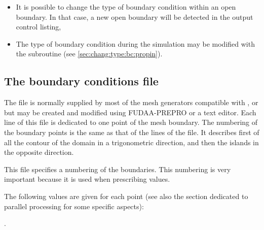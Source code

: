 \begin{itemize}
\item It is possible to change the type of boundary condition within an open
boundary.
In that case, a new open boundary will be detected in the output control listing,

\item The type of boundary condition during the simulation may be modified with
the  subroutine (see \ref{sec:chang:type:bc:propin}).
\end{itemize}


\subsection{The boundary conditions file}
\label{sub:bc:file}
The file is normally supplied by most of the mesh generators compatible
with \tel, or \stbtel
but may be created and modified using FUDAA-PREPRO or a text editor.
Each line of this file is dedicated to one point of the mesh boundary.
The numbering of the boundary points is the same as that of the lines of the
file.
It describes first of all the contour of the domain in a trigonometric direction,
and then the islands in the opposite direction.

This file specifies a numbering of the boundaries.
This numbering is very important because it is used when prescribing values.

The following values are given for each point
(see also the section dedicated to parallel processing for some specific aspects):

.

